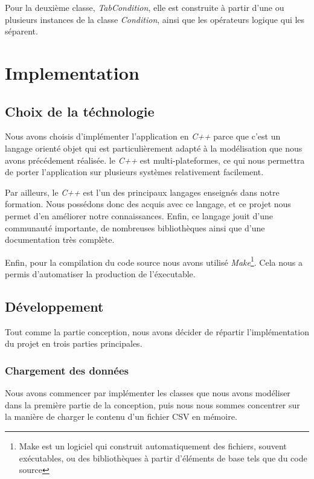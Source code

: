 \documentclass[oneside,13pt,a4paper]{report}
\begin{document}
Pour la deuxième classe, \textit{TabCondition}, elle est construite à partir d'une ou plusieurs instances de la classe \textit{Condition}, ainsi que les opérateurs logique qui les séparent.



\chapter{Implementation}

\section{Choix de la téchnologie}
Nous avons choisis d'implémenter l'application en \textit{C++} parce que c'est un langage orienté objet qui est particulièrement adapté à la modélisation que nous avons précédement réalisée.
le \textit{C++}  est multi-plateformes, ce qui nous permettra de porter l’application sur plusieurs systèmes relativement facilement.

Par ailleurs, le \textit{C++} est l’un des principaux langages enseignés dans notre formation. Nous possédons donc des acquis avec ce langage, et ce projet nous permet d’en améliorer notre connaissances.
Enfin, ce langage jouit d’une communauté importante, de nombreuses bibliothèques ainsi que d’une documentation très complète.

Enfin, pour la compilation du code source nous avons utilisé \textit{Make}\footnote{Make est un logiciel qui construit automatiquement des fichiers, souvent exécutables, ou des bibliothèques à partir d'éléments de base tels que du code source}. Cela nous a permis d'automatiser la production de l'éxecutable.

\section{Développement}

Tout comme la partie conception, nous avons décider de répartir l'implémentation du projet en trois parties principales.

\subsection{Chargement des données}

Nous avons commencer par implémenter les classes que nous avons modéliser dans la première partie de la conception, puis nous nous sommes concentrer sur la manière de charger le contenu d'un fichier CSV en mémoire.
\end{document}
